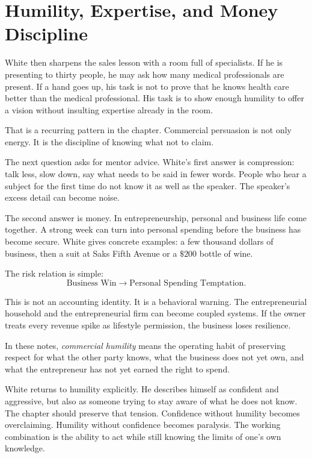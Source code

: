 \section{Humility, Expertise, and Money Discipline}

White then sharpens the sales lesson with a room full of specialists. If he is presenting to thirty people, he may ask how many medical professionals are present. If a hand goes up, his task is not to prove that he knows health care better than the medical professional. His task is to show enough humility to offer a vision without insulting expertise already in the room.

That is a recurring pattern in the chapter. Commercial persuasion is not only energy. It is the discipline of knowing what not to claim.

The next question asks for mentor advice. White's first answer is compression: talk less, slow down, say what needs to be said in fewer words. People who hear a subject for the first time do not know it as well as the speaker. The speaker's excess detail can become noise.

The second answer is money. In entrepreneurship, personal and business life come together. A strong week can turn into personal spending before the business has become secure. White gives concrete examples: a few thousand dollars of business, then a suit at Saks Fifth Avenue or a \(\$200\) bottle of wine.

The risk relation is simple:
\begin{equation}
\text{Business Win}
\longrightarrow
\text{Personal Spending Temptation}.
\end{equation}

This is not an accounting identity. It is a behavioral warning. The entrepreneurial household and the entrepreneurial firm can become coupled systems. If the owner treats every revenue spike as lifestyle permission, the business loses resilience.

\begin{definition}
In these notes, \emph{commercial humility} means the operating habit of preserving respect for what the other party knows, what the business does not yet own, and what the entrepreneur has not yet earned the right to spend.
\end{definition}

White returns to humility explicitly. He describes himself as confident and aggressive, but also as someone trying to stay aware of what he does not know. The chapter should preserve that tension. Confidence without humility becomes overclaiming. Humility without confidence becomes paralysis. The working combination is the ability to act while still knowing the limits of one's own knowledge.

